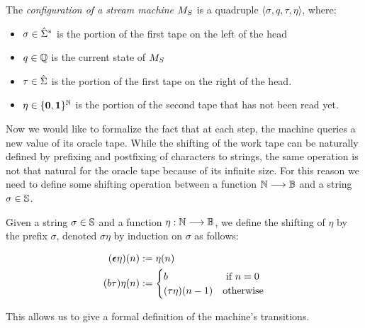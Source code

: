\begin{conditional}{\notappendix}
    \begin{defn}
    The \emph{configuration of a stream machine $M_S$}
    is a quadruple $\langle \sigma, q, \tau, \eta\rangle$,
    where;
    \begin{itemize}
    \itemsep0em
    \item $\sigma\in \hat{\Sigma}^*$
    is the portion of the first tape on the left
    of the head
    \item $q\in \mathbb{Q}$ is the current state of $M_S$
    \item $\tau\in \hat{\Sigma}$ is the portion of the first
    tape on the right of the head.
    \item $\eta \in \{\mathbf{0},\mathbf{1}\}^{\mathbb{N}}$
    is the portion of the second tape that has not been read yet.
    \end{itemize}
    \end{defn}


    Now we would like to formalize the fact that at each step,
    the machine queries a new value of its oracle tape.
    While the shifting of the work tape can be naturally defined
    by prefixing and postfixing of characters to strings, the same operation
    is not that natural for the oracle tape because of its infinite size.
    For this reason we need to define some shifting operation between
    a function $\mathbb{N} \longrightarrow \mathbb{B}$ and a string $\sigma \in \mathbb{S}$.

    \begin{defn}
      Given a string $\sigma \in \mathbb{S}$ and a function
      $\eta: \mathbb{N} \longrightarrow \mathbb{B}$, we define the shifting of $\eta$
      by the prefix $\sigma$, denoted $\sigma\eta$ by induction on $\sigma$
      as follows:

      \begin{align*}
      (\bm{\epsilon} \eta)(n) &:= \eta(n)\\
      (b\tau)\eta(n) &:= \begin{cases}
                          b & \text{ if } n = 0\\
                          (\tau\eta)(n-1) & \text{otherwise}\\
                        \end{cases}
      \end{align*}

    \end{defn}

    This allows us to give a formal definition of the machine's transitions.


\end{conditional}
